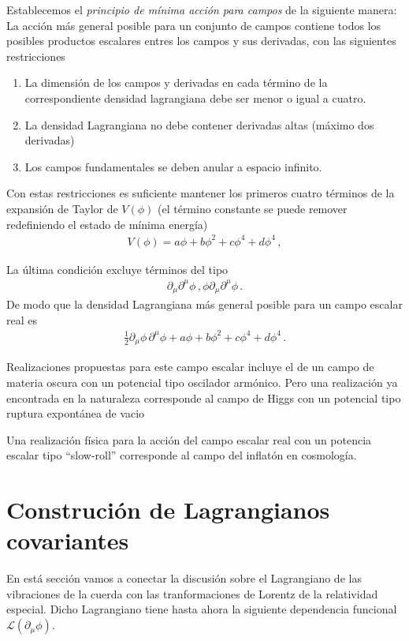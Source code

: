 Establecemos el \emph{principio de mínima acción para campos} de la siguiente manera: La acción más general posible para un conjunto de campos contiene todos los posibles productos escalares entres los campos y sus derivadas, con las siguientes restricciones
\begin{enumerate}
\item La dimensión de los campos y derivadas en cada término de la correspondiente densidad lagrangiana debe ser menor o igual a cuatro.
\item La densidad Lagrangiana no debe contener derivadas altas (máximo dos derivadas)
\item Los campos fundamentales se deben anular a espacio infinito.
\end{enumerate}
Con estas restricciones es suficiente mantener los primeros cuatro términos de la expansión de Taylor de $V(\phi)$ (el término constante se puede remover redefiniendo el estado de mínima energía)
\begin{align}
  V(\phi)=a \phi + b\phi^2+c\phi^4+d\phi^4\,,
\end{align}

La última condición excluye términos del tipo
\begin{align}
  \partial_\mu \partial^\mu \phi\,,   \phi\partial_\mu \partial^\mu \phi\,.
\end{align}
De modo que la densidad Lagrangiana más general posible para un campo escalar real es
\begin{align}
  \frac{1}{2}{\partial_\mu\phi}\,{\partial^\mu\phi}+a \phi + b\phi^2+c\phi^4+d\phi^4\,.
\end{align}

Realizaciones propuestas para este campo escalar incluye el de un campo de materia oscura con un potencial tipo oscilador armónico.
Pero una realización ya encontrada en la naturaleza corresponde al campo de Higgs con un potencial tipo ruptura expontánea de vacio

Una realización física para la acción del campo escalar real con un potencia escalar tipo ``slow-roll''  corresponde al campo del inflatón en cosmología.



\section{Construción de Lagrangianos covariantes}

En está sección vamos a conectar la discusión sobre el Lagrangiano de las vibraciones de la cuerda con las tranformaciones de Lorentz de la relatividad especial. Dicho Lagrangiano tiene hasta ahora la siguiente dependencia funcional $\mathcal{L}(\partial_{\mu}\phi)$.


